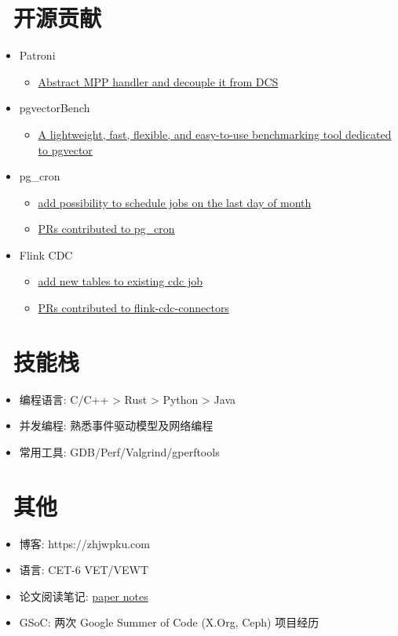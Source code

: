 \documentclass{resume}
\begin{document}
\section{\faCodeFork\ 开源贡献}
\begin{onehalfspacing}
  \begin{itemize}
    \item Patroni
      \begin{itemize}
        \item \href{https://github.com/zalando/patroni/pull/2960}{Abstract MPP handler and decouple it from DCS}
      \end{itemize}
    \item pgvectorBench
      \begin{itemize}
        \item \href{https://github.com/zhjwpku/pgvectorBench}{A lightweight, fast, flexible, and easy-to-use benchmarking tool dedicated to pgvector}
      \end{itemize}
    \item pg\_cron
      \begin{itemize}
        \item \href{https://github.com/citusdata/pg_cron/pull/273}{add possibility to schedule jobs on the last day of month}
        \item \href{https://github.com/citusdata/pg_cron/pulls?q=is%3Apr+author%3A%40me+}{PRs contributed to pg\_cron}
      \end{itemize}
    \item Flink CDC
      \begin{itemize}
        \item \href{https://github.com/ververica/flink-cdc-connectors/pull/777}{add new tables to existing cdc job}
        \item \href{https://github.com/ververica/flink-cdc-connectors/pulls?q=is%3Apr+author%3Azhjwpku+}{PRs contributed to flink-cdc-connectors}
      \end{itemize}
  \end{itemize}
  \end{onehalfspacing}

\section{\faWrench\ 技能栈}
\begin{itemize}[parsep=0.5ex]
  \item 编程语言:  C/C++ > Rust > Python > Java
  \item 并发编程: 熟悉事件驱动模型及网络编程
  \item 常用工具: GDB/Perf/Valgrind/gperftools
\end{itemize}

\section{\faCogs\ 其他}
\begin{itemize}[parsep=0.5ex]
  \item 博客: https://zhjwpku.com
  \item 语言: CET-6 VET/VEWT
  \item 论文阅读笔记: \href{https://paper-notes.zhjwpku.com/}{paper notes}
  \item GSoC: 两次 Google Summer of Code (X.Org, Ceph) 项目经历
\end{itemize}
\end{document}
